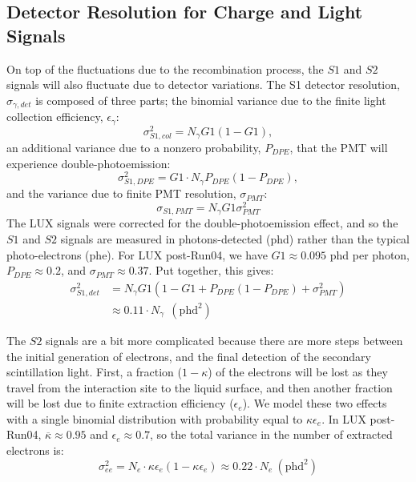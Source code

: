 \clearpage

\subsection{Detector Resolution for Charge and Light Signals}\label{sec:detres}
On top of the fluctuations due to the recombination process, the $S1$ and $S2$ signals will also fluctuate due to detector variations. The S1 detector resolution, $\sigma_{\gamma,det}$ is composed of three parts; the binomial variance due to the finite light collection efficiency, $\epsilon_{\gamma}$:
\begin{equation}
\sigma_{S1,col}^2=N_{\gamma}G1(1-G1), 
\end{equation}
an additional variance due to a nonzero probability, $P_{DPE}$, that the PMT will experience double-photoemission\cite{DPE}:
\begin{equation}
\sigma_{S1,DPE}^2=G1\cdot N_{\gamma}P_{DPE}(1-P_{DPE}), 
\end{equation}
and the variance due to finite PMT resolution, $\sigma_{PMT}$:
\begin{equation}
\sigma_{S1,PMT}=N_{\gamma}G1\sigma_{PMT}^2
\end{equation}
The LUX signals were corrected for the double-photoemission effect, and so the $S1$ and $S2$ signals are measured in photons-detected (phd) rather than the typical photo-electrons (phe). For LUX post-Run04, we have $G1\approx 0.095$ phd per photon, $P_{DPE}\approx 0.2$, and $\sigma_{PMT}\approx 0.37$. Put together, this gives:
\begin{equation}
\begin{split}
\sigma_{S1,det}^2&=N_{\gamma}G1(1-G1+P_{DPE}(1-P_{DPE})+\sigma_{PMT}^2)\\
&\approx 0.11 \cdot N_{\gamma} \ \ (\text{phd}^2)
\end{split}
\end{equation}

The $S2$ signals are a bit more complicated because there are more steps between the initial generation of electrons, and the final detection of the secondary scintillation light. First, a fraction ($1-\kappa$) of the electrons will be lost as they travel from the interaction site to the liquid surface, and then another fraction will be lost due to finite extraction efficiency ($\epsilon_e$). We model these two effects with a single binomial distribution with probability equal to $\kappa\epsilon_e$. In LUX post-Run04, $\overline{\kappa} \approx 0.95$ and $\epsilon_e \approx 0.7$, so the total variance in the number of extracted electrons is:
\begin{equation}
\sigma_{ee}^2=N_e\cdot \kappa\epsilon_e(1-\kappa\epsilon_e)\approx 0.22 \cdot N_e \ (\text{phd}^2)
\end{equation}

